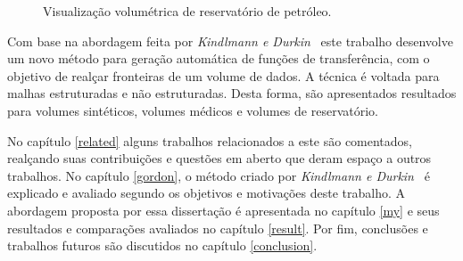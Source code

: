 \begin{figure}[h]
	\centering
    \caption{Visualização volumétrica de reservatório de petróleo.}
\end{figure}
    
    Com base na abordagem feita por \textit{Kindlmann e Durkin}~\cite{gordon} este trabalho desenvolve um novo método para geração automática de funções de transferência, com o objetivo de realçar fronteiras de um volume de dados. A técnica é voltada para malhas estruturadas e não estruturadas. Desta forma, são apresentados resultados para volumes sintéticos, volumes médicos e volumes de reservatório.

    No capítulo \ref{related} alguns trabalhos relacionados a este são comentados, realçando suas contribuições e questões em aberto que deram espaço a outros trabalhos. No capítulo \ref{gordon}, o método criado por \textit{Kindlmann e Durkin}~\cite{gordon} é explicado e avaliado segundo os objetivos e motivações deste trabalho. A abordagem proposta por essa dissertação é apresentada no capítulo \ref{my} e seus resultados e comparações avaliados no capítulo \ref{result}. Por fim, conclusões e trabalhos futuros são discutidos no capítulo \ref{conclusion}.